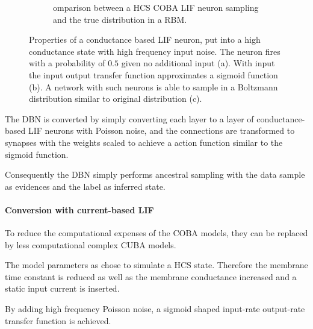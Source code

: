 \begin{figure}
\begin{subfigure}[t]{.5\textwidth}
  		\caption{omparison between a HCS COBA LIF neuron sampling and the true distribution in a RBM.}
  		\label{fig:sub2}
	\end{subfigure}
	\caption{Properties of a conductance based LIF neuron, put into a high conductance state with high frequency input noise. The neuron fires with a probability of $0.5$ given no additional input (a). With input the input output transfer function approximates a sigmoid function (b). A network with such neurons is able to sample in a Boltzmann distribution similar to original distribution (c). }
	\label{fig:cobahcs}

\end{figure}
  
The DBN is converted by simply converting each layer to a layer of conductance-based LIF neurons with Poisson noise, and the connections are transformed to synapses with the weights scaled to achieve a action function similar to the sigmoid function.

Consequently the DBN simply performs ancestral sampling with the data sample as evidences and the label as inferred state.   


\paragraph{Conversion with current-based LIF}

To reduce the computational expenses of the COBA models, they can be replaced by less computational complex CUBA models.

The model parameters as chose to simulate a HCS state.
Therefore the membrane time constant is reduced as well as the membrane conductance increased and a static input current is inserted.  

By adding high frequency Poisson noise, a sigmoid shaped input-rate output-rate transfer function is achieved.

